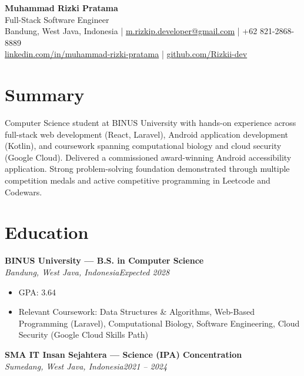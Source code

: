\documentclass[10.5pt,a4paper]{article}
\newcommand{\cvheading}[3]{%
  \noindent\textbf{#1}\\
  \textit{#2}\hfill\textit{#3}\par
}
\begin{document}
\begin{center}
  {\Large\textbf{Muhammad Rizki Pratama}}\\[1pt]
  Full-Stack Software Engineer\\[1pt]
  Bandung, West Java, Indonesia \; | \;
  \href{mailto:m.rizkip.developer@gmail.com}{m.rizkip.developer@gmail.com} \; | \; +62 821-2868-8889 \\
  \href{https://www.linkedin.com/in/muhammad-rizki-pratama-151161213/}{linkedin.com/in/muhammad-rizki-pratama} \; | \;
  \href{https://github.com/Rizkii-dev}{github.com/Rizkii-dev}
\end{center}
\vspace{-6pt}

\section*{Summary}
Computer Science student at BINUS University with hands-on experience across full-stack web development (React, Laravel), Android application development (Kotlin), and coursework spanning computational biology and cloud security (Google Cloud). Delivered a commissioned award-winning Android accessibility application. Strong problem-solving foundation demonstrated through multiple competition medals and active competitive programming in Leetcode and Codewars.

\section*{Education}

\cvheading{BINUS University --- B.S. in Computer Science}{Bandung, West Java, Indonesia}{Expected 2028}
\begin{itemize}
  \item GPA: 3.64
  \item Relevant Coursework: Data Structures \& Algorithms, Web-Based Programming (Laravel), Computational Biology, Software Engineering, Cloud Security (Google Cloud Skills Path)
\end{itemize}

\cvheading{SMA IT Insan Sejahtera --- Science (IPA) Concentration}{Sumedang, West Java, Indonesia}{2021 -- 2024}
\begin{itemize}
\end{itemize}

\end{document}
